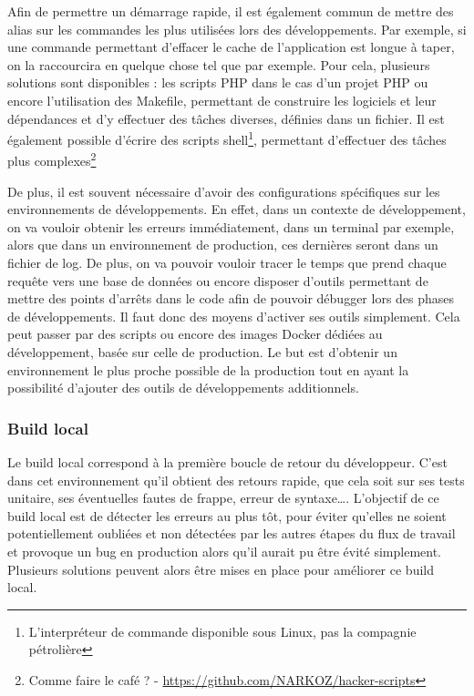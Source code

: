 Afin de permettre un démarrage rapide, il est également commun de mettre des alias sur les commandes les plus utilisées lors des développements. Par exemple, si une commande permettant d'effacer le cache de l'application est longue à taper, on la raccourcira en quelque chose tel que  par exemple. Pour cela, plusieurs solutions sont disponibles : les scripts \gls{PHP} dans le cas d'un projet \gls{PHP} ou encore l'utilisation des Makefile, permettant de construire les logiciels et leur dépendances et d'y effectuer des tâches diverses, définies dans un fichier. Il est également possible d'écrire des scripts shell\footnote{L'interpréteur de commande disponible sous Linux, pas la compagnie pétrolière }, permettant d'effectuer des tâches plus complexes\footnote{Comme faire le café ?  - \url{https://github.com/NARKOZ/hacker-scripts}}

De plus, il est souvent nécessaire d'avoir des configurations spécifiques sur les environnements de développements. En effet, dans un contexte de développement, on va vouloir obtenir les erreurs immédiatement, dans un terminal par exemple, alors que dans un environnement de production, ces dernières seront dans un fichier de log. De plus, on va pouvoir vouloir tracer le temps que prend chaque requête vers une base de données ou encore disposer d'outils permettant de mettre des points d'arrêts dans le code afin de pouvoir débugger lors des phases de développements. Il faut donc des moyens d'activer ses outils simplement. Cela peut passer par des scripts ou encore des images Docker dédiées au développement, basée sur celle de production. Le but est d'obtenir un environnement le plus proche possible de la production tout en ayant la possibilité d'ajouter des outils de développements additionnels.

\subsubsection{Build local}

Le build local correspond à la première boucle de retour du développeur. C'est dans cet environnement qu'il obtient des retours rapide, que cela soit sur ses tests unitaire, ses éventuelles fautes de frappe, erreur de syntaxe\ldots. L'objectif de ce build local est de détecter les erreurs au plus tôt, pour éviter qu'elles ne soient potentiellement oubliées et non détectées par les autres étapes du flux de travail et provoque un bug en production alors qu'il aurait pu être évité simplement. Plusieurs solutions peuvent alors être mises en place pour améliorer ce build local.


